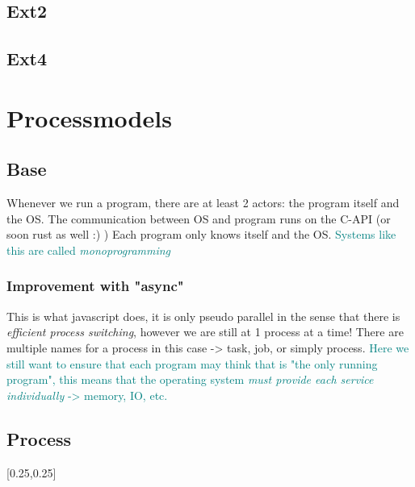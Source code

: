 \documentclass[main.tex,fontsize=8pt,paper=a4,paper=portrait,DIV=calc,]{scrartcl}
\begin{document}
\subsection{Ext2}

\subsection{Ext4}

\section{Processmodels}
\subsection{Base}
Whenever we run a program, there are at least 2 actors: the program itself and the OS.\newline
The communication between OS and program runs on the C-API (or soon rust as well :) )\newline
Each program only knows itself and the OS.\newline
\textcolor{teal}{Systems like this are called \emph{monoprogramming}}

\subsubsection{Improvement with "async"}
This is what javascript does, it is only pseudo parallel in the sense that there is \emph{efficient process switching}, however we are still at 1 process at a time!\newline
There are multiple names for a process in this case -> task, job, or simply process. \newline
\textcolor{teal}{Here we still want to ensure that each program may think that is "the only running program",\newline
this means that the operating system \emph{must provide each service individually} -> memory, IO, etc. }

\subsection{Process}
[0.25,0.25]
\end{document}
